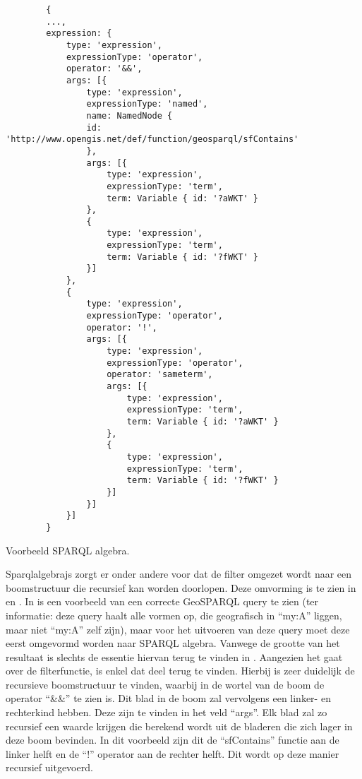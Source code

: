 \begin{listing}[ht]
    \begin{verbatim}
        {
        ...,
        expression: {
            type: 'expression',
            expressionType: 'operator',
            operator: '&&',
            args: [{
                type: 'expression',
                expressionType: 'named',
                name: NamedNode {
                id: 'http://www.opengis.net/def/function/geosparql/sfContains'
                },
                args: [{
                    type: 'expression',
                    expressionType: 'term',
                    term: Variable { id: '?aWKT' }
                },
                {
                    type: 'expression',
                    expressionType: 'term',
                    term: Variable { id: '?fWKT' }
                }]
            },
            {
                type: 'expression',
                expressionType: 'operator',
                operator: '!',
                args: [{
                    type: 'expression',
                    expressionType: 'operator',
                    operator: 'sameterm',
                    args: [{
                        type: 'expression',
                        expressionType: 'term',
                        term: Variable { id: '?aWKT' }
                    },
                    {
                        type: 'expression',
                        expressionType: 'term',
                        term: Variable { id: '?fWKT' }
                    }]
                }]
            }]
        }
    \end{verbatim}
    \caption{Voorbeeld SPARQL algebra.}
    \label{listing:sparqlalgebrajs_algebra}
\end{listing}

Sparqlalgebrajs zorgt er onder andere voor dat de filter omgezet wordt naar een boomstructuur die recursief kan worden doorlopen. Deze omvorming is te zien in  en . In  is een voorbeeld van een correcte GeoSPARQL query te zien (ter informatie: deze query haalt alle vormen op, die geografisch in ``my:A'' liggen, maar niet ``my:A'' zelf zijn), maar voor het uitvoeren van deze query moet deze eerst omgevormd worden naar SPARQL algebra. Vanwege de grootte van het resultaat is slechts de essentie hiervan terug te vinden in . Aangezien het gaat over de filterfunctie, is enkel dat deel terug te vinden. Hierbij is zeer duidelijk de recursieve boomstructuur te vinden, waarbij in de wortel van de boom de operator ``\&\&'' te zien is. Dit blad in de boom zal vervolgens een linker- en rechterkind hebben. Deze zijn te vinden in het veld ``args''. Elk blad zal zo recursief een waarde krijgen die berekend wordt uit de bladeren die zich lager in deze boom bevinden. In dit voorbeeld zijn dit de ``sfContains'' functie aan de linker helft en de ``!'' operator aan de rechter helft. Dit wordt op deze manier recursief uitgevoerd.

